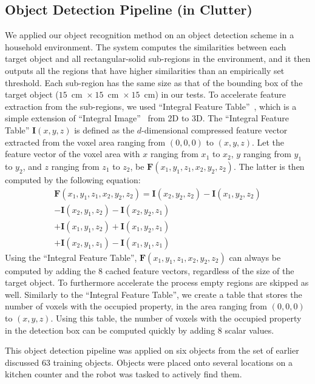 \documentclass[a4paper, 10 pt, conference]{sty/ieeeconf}
\begin{document}
\subsection{Object Detection Pipeline (in Clutter)}
\label{sec:recognition}
We applied our object recognition method on an object detection scheme in a household
environment. The system computes the similarities between each target object and all 
rectangular-solid sub-regions in the environment, and it then outputs all the regions
that have higher similarities than an empirically set threshold.
Each sub-region has the same size as that of the bounding box of the target object 
($15$~cm~$\times~15$~cm~$\times~15$~cm) in our tests.
To accelerate feature extraction from the sub-regions, we used ``Integral Feature Table''~\cite{kanezaki2010tvc}, 
which is a simple extension of ``Integral Image''~\cite{integral_image} from 2D to 3D.
The ``Integral Feature Table'' $\bm{I}(x,y,z)$ is defined as the $d$-dimensional 
compressed feature vector extracted from the voxel area ranging from $(0,0,0)$ to $(x,y,z)$.
Let the feature vector of the voxel area with $x$ ranging from $x_1$ to $x_2$,
$y$ ranging from $y_1$ to $y_2$, and $z$ ranging from $z_1$ to $z_2$, be $\bm{F}(x_1,y_1,z_1,x_2,y_2,z_2)$.
The latter is then computed by the following equation:
\begin{eqnarray*}\label{eq:sat}
\bm{F}(x_1,y_1,z_1,x_2,y_2,z_2) = \bm{I}(x_2,y_2,z_2) - \bm{I}(x_1,y_2,z_2)
                           \\ - \bm{I}(x_2,y_1,z_2) - \bm{I}(x_2,y_2,z_1)
                           \\ + \bm{I}(x_1,y_1,z_2) + \bm{I}(x_1,y_2,z_1)
                           \\ + \bm{I}(x_2,y_1,z_1) - \bm{I}(x_1,y_1,z_1)
\end{eqnarray*}
Using the ``Integral Feature Table'', $\bm{F}(x_1,y_1,z_1,x_2,y_2,z_2)$ can always be 
computed by adding the 8 cached feature vectors, regardless of the size of the target object.
To furthermore accelerate the process empty regions are skipped as well.
Similarly to the ``Integral Feature Table'', we create a table that stores
the number of voxels with the occupied property, in the area ranging from $(0,0,0)$ to $(x,y,z)$.
Using this table, the number of voxels with the occupied property in the detection 
box can be computed quickly by adding 8 scalar values.

This object detection pipeline was applied on six objects from the set of 
earlier discussed 63 training objects. Objects were placed onto several locations on a kitchen counter and the robot was tasked to actively find them.
\end{document}
